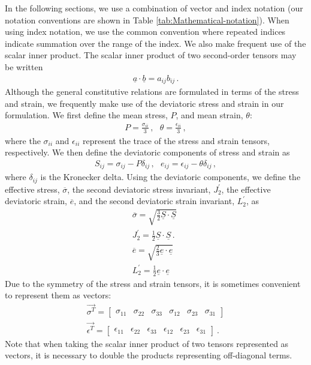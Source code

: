 In the following sections, we use a combination of vector and index
notation (our notation conventions are shown in Table \ref{tab:Mathematical-notation}).
When using index notation, we use the common convention where repeated
indices indicate summation over the range of the index. We also make
frequent use of the scalar inner product. The scalar inner product
of two second-order tensors may be written
\begin{gather}
\underline{a}\cdot\underline{b}=a_{ij}b_{ij}\,.\label{eq:14}
\end{gather}
Although the general constitutive relations are formulated in terms
of the stress and strain, we frequently make use of the deviatoric
stress and strain in our formulation. We first define the mean stress,
$P$, and mean strain, $\theta$:
\begin{gather}
P=\frac{\sigma_{ii}}{3}\,,\,\,\,\,\theta=\frac{\epsilon_{ii}}{3}\,,\label{eq:15}
\end{gather}
where the $\sigma_{ii}$ and $\epsilon_{ii}$ represent the trace
of the stress and strain tensors, respectively. We then define the
deviatoric components of stress and strain as
\begin{gather}
S_{ij}=\sigma_{ij}-P\delta_{ij}\,,\,\,\,\, e_{ij}=\epsilon_{ij}-\theta\delta_{ij}\,,\label{eq:16}
\end{gather}
where $\delta_{ij}$ is the Kronecker delta. Using the deviatoric
components, we define the effective stress, $\overline{\sigma}$,
the second deviatoric stress invariant, $J_{2}^{\prime}$, the effective
deviatoric strain, $\overline{e}$, and the second deviatoric strain
invariant, $L_{2}^{\prime}$, as
\begin{gather}
\overline{\sigma}=\sqrt{\frac{3}{2}\underline{S}\cdot\underline{S}}\,\,\nonumber \\
J_{2}^{\prime}=\frac{1}{2}\underline{S}\cdot\underline{S}\,.\label{eq:17}\\
\overline{e}=\sqrt{\frac{2}{3}\underline{e}\cdot\underline{e}}\,\,\nonumber \\
L_{2}^{\prime}=\frac{1}{2}\underline{e}\cdot\underline{e}\,\,\nonumber 
\end{gather}
Due to the symmetry of the stress and strain tensors, it is sometimes
convenient to represent them as vectors:
\begin{gather}
\overrightarrow{\sigma^{T}}=\left[\begin{array}{cccccc}
\sigma_{11} & \sigma_{22} & \sigma_{33} & \sigma_{12} & \sigma_{23} & \sigma_{31}\end{array}\right]\label{eq:18}\\
\overrightarrow{\epsilon^{T}}=\left[\begin{array}{cccccc}
\epsilon_{11} & \epsilon_{22} & \epsilon_{33} & \epsilon_{12} & \epsilon_{23} & \epsilon_{31}\end{array}\right]\:.\nonumber 
\end{gather}
Note that when taking the scalar inner product of two tensors represented
as vectors, it is necessary to double the products representing off-diagonal
terms.

